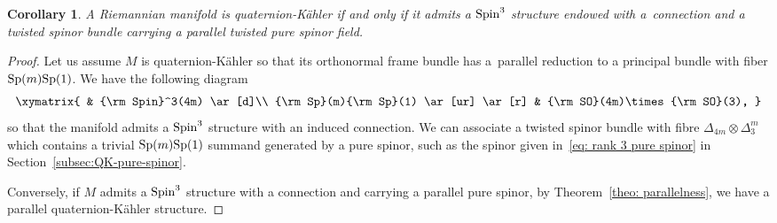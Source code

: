 \documentclass[10pt,a4paper]{amsart}
\numberwithin{equation}{section}
\newtheorem{Corollary}[Theorem]{Corollary}
\begin{document}
\begin{Corollary} A Riemannian manifold is quaternion-K\"ahler if and only if it admits a ${\rm Spin}^3$ structure endowed with a~connection and a twisted spinor bundle carrying a parallel twisted pure spinor field.
\end{Corollary}
\begin{proof} Let us assume $M$ is quaternion-K\"ahler so that its orthonormal frame bundle has a~parallel reduction to a principal bundle with fiber ${\rm Sp}(m){\rm Sp}(1)$. We have the following diagram
\begin{gather*}
\xymatrix{
 & {\rm Spin}^3(4m) \ar[d]\\
{\rm Sp}(m){\rm Sp}(1) \ar[ur] \ar[r] & {\rm SO}(4m)\times {\rm SO}(3),
}
\end{gather*}
so that the manifold admits a ${\rm Spin}^3$ structure with an induced connection. We can associate a twisted spinor bundle with fibre $\Delta_{4m}\otimes \Delta_3^{m}$ which contains a trivial ${\rm Sp}(m){\rm Sp}(1)$ summand generated by a pure spinor, such as the spinor given in~\eqref{eq: rank 3 pure spinor} in Section~\ref{subsec:QK-pure-spinor}.

Conversely, if $M$ admits a ${\rm Spin}^3$ structure with a connection and carrying a parallel pure spinor, by Theorem~\ref{theo: parallelness}, we have a parallel quaternion-K\"ahler structure.
\end{proof}
\end{document}
